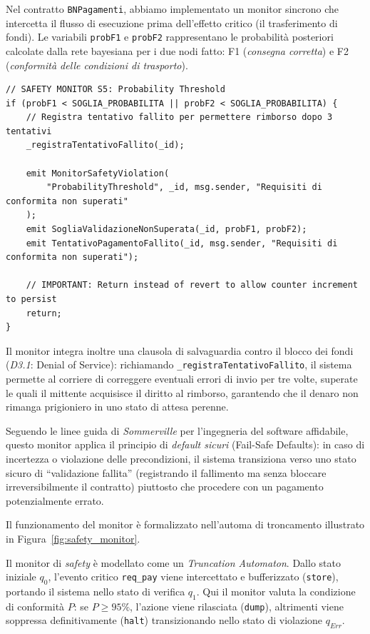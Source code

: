 Nel contratto \texttt{BNPagamenti}, abbiamo implementato un monitor sincrono che intercetta il flusso di esecuzione prima dell'effetto critico (il trasferimento di fondi). Le variabili \texttt{probF1} e \texttt{probF2} rappresentano le probabilità posteriori calcolate dalla rete bayesiana per i due nodi fatto: F1 (\textit{consegna corretta}) e F2 (\textit{conformità delle condizioni di trasporto}).

\begin{lstlisting}[language=Solidity, caption=Monitor di safety per la soglia di probabilità]
// SAFETY MONITOR S5: Probability Threshold
if (probF1 < SOGLIA_PROBABILITA || probF2 < SOGLIA_PROBABILITA) {
    // Registra tentativo fallito per permettere rimborso dopo 3 tentativi
    _registraTentativoFallito(_id);
    
    emit MonitorSafetyViolation(
        "ProbabilityThreshold", _id, msg.sender, "Requisiti di conformita non superati"
    );
    emit SogliaValidazioneNonSuperata(_id, probF1, probF2);
    emit TentativoPagamentoFallito(_id, msg.sender, "Requisiti di conformita non superati");
    
    // IMPORTANT: Return instead of revert to allow counter increment to persist
    return;
}
\end{lstlisting}

Il monitor integra inoltre una clausola di salvaguardia contro il blocco dei fondi (\textit{D3.1}: Denial of Service): richiamando \texttt{\_registraTentativoFallito}, il sistema permette al corriere di correggere eventuali errori di invio per tre volte, superate le quali il mittente acquisisce il diritto al rimborso, garantendo che il denaro non rimanga prigioniero in uno stato di attesa perenne.

Seguendo le linee guida di \textit{Sommerville} per l'ingegneria del software affidabile, questo monitor applica il principio di \textit{default sicuri} (Fail-Safe Defaults): in caso di incertezza o violazione delle precondizioni, il sistema transiziona verso uno stato sicuro di ``validazione fallita'' (registrando il fallimento ma senza bloccare irreversibilmente il contratto) piuttosto che procedere con un pagamento potenzialmente errato.

Il funzionamento del monitor è formalizzato nell'automa di troncamento illustrato in Figura~\ref{fig:safety_monitor}.


Il monitor di \textit{safety} è modellato come un \textit{Truncation Automaton}. Dallo stato iniziale $q_0$, l'evento critico \texttt{req\_pay} viene intercettato e bufferizzato (\texttt{store}), portando il sistema nello stato di verifica $q_1$. Qui il monitor valuta la condizione di conformità $P$: se $P \ge 95\%$, l'azione viene rilasciata (\texttt{dump}), altrimenti viene soppressa definitivamente (\texttt{halt}) transizionando nello stato di violazione $q_{Err}$.

